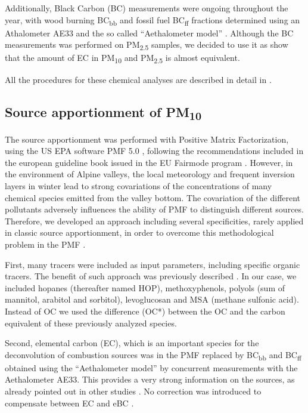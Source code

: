 \documentclass[acp, manuscript]{copernicus}
\begin{document}
Additionally, Black Carbon (BC) measurements were ongoing throughout the year,
with wood burning BC\textsubscript{bb} and fossil fuel BC\textsubscript{ff}
fractions determined using an Athalometer AE33 and the so called ``Aethalometer
model'' \citep{sandradewi_using_2008,drinovec_dual-spot_2015}.  Although the BC
measurements was performed on PM\textsubscript{2.5} samples, we decided to use
it as \citet{jaffrezo_size_2005,cavalli_european_2016} show that the amount of EC in
PM\textsubscript{10} and PM\textsubscript{2.5} is almost equivalent.

All the procedures for these chemical analyses
are described in detail in \citet{chevrier_chauffage_2016}.

\subsection{\texorpdfstring{Source apportionment of PM\textsubscript{10}}{Source
apportionment of PM10}}\label{source-apportionment-of-pm10}

The source apportionment was performed with Positive Matrix Factorization, using
the US EPA software PMF 5.0 \citep{us_epa_positive_2017}, following the
recommendations included in the european guideline book issued in the EU Fairmode program
\citep{belis_european_2014}. However, in the environment of Alpine valleys, the
local meteorology and frequent inversion layers in winter lead to strong
covariations of the concentrations of many chemical species emitted from the
valley bottom.
The covariation of the different pollutants adversely influences the ability of
PMF to distinguish different sources.
Therefore, we developed an approach including several
specificities, rarely applied in classic source apportionment, in order to
overcome this methodological problem in the PMF \citep{chevrier_chauffage_2016}.

First, many tracers were included as input parameters, including specific
organic tracers. The benefit of such approach was previously described
\citep{golly_etude_2014,waked_source_2014,srivastava_speciation_2017}. In our
case, we included hopanes (thereafter named HOP), methoxyphenols, polyols (sum
of mannitol, arabitol and sorbitol), levoglucosan and MSA (methane sulfonic
acid). Instead of OC we used the difference (OC*) between the OC and
the carbon equivalent of these previously analyzed species.

Second, elemental carbon (EC), which is an important species for the
deconvolution of combustion sources was in the PMF replaced by
BC\textsubscript{bb} and BC\textsubscript{ff} obtained using the ``Aethalometer
model'' by concurrent measurements with the Aethalometer AE33. This provides a very strong
information on the sources, as already pointed out in other studies
\citep{petit_two_2015}. No correction was introduced to compensate between EC
and eBC \citep{zanatta_european_2016}.
\end{document}
